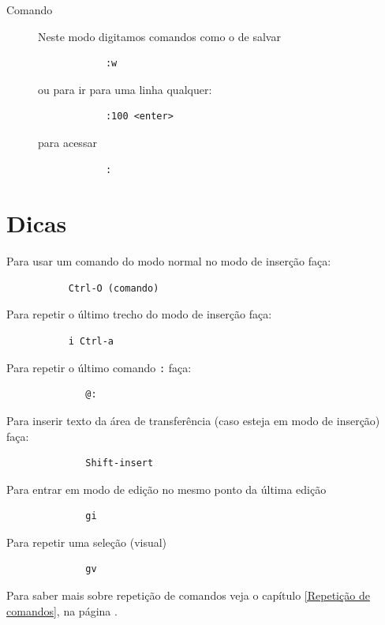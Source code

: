 \documentclass[10pt,a4paper,openany]{book}
\begin{document}
\begin{description}
\item [Comando] Neste modo digitamos comandos como o de salvar

\begin{verbatim}
			:w
\end{verbatim}

ou para ir para uma linha qualquer:

\begin{verbatim}
			:100 <enter>
\end{verbatim}

para acessar
\begin{verbatim}
			:
\end{verbatim}

\end{description}

\section{Dicas}
\label{Dicas}
Para usar um comando do modo normal no modo de inserção faça:

\begin{verbatim}
		   Ctrl-O (comando)
\end{verbatim}

Para repetir o último trecho do modo de inserção faça:

\begin{verbatim}
		   i Ctrl-a
\end{verbatim}

Para repetir o último comando \verb+:+ faça:

\begin{verbatim}
			  @:
\end{verbatim}

Para inserir texto da área de transferência (caso esteja em modo de inserção) faça:

\begin{verbatim}
			  Shift-insert
\end{verbatim}

Para entrar em modo de edição no mesmo ponto da última edição

\begin{verbatim}
			  gi
\end{verbatim}

Para repetir uma seleção (visual)

\begin{verbatim}
			  gv
\end{verbatim}

Para saber mais sobre repetição de comandos veja o capítulo \ref{Repetição de comandos},
na página \pageref{Repetição de comandos}.
\end{document}

